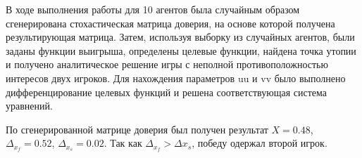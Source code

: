 \conclusion

В ходе выполнения работы для 10 агентов была случайным образом сгенерирована стохастическая матрица доверия,
на основе которой получена результирующая матрица. Затем, используя выборку из случайных агентов, были заданы
функции выигрыша, определены целевые функции, найдена точка утопии и получено аналитическое решение игры с неполной
противоположностью интересов двух игроков. Для нахождения параметров uu и vv было выполнено дифференцирование целевых
функций и решена соответствующая система уравнений.

По сгенерированной матрице доверия был получен результат $X = 0.48$, $\Delta_{x_f} = 0.52$, $\Delta_{x_s} = 0.02$.
Так как $\Delta_{x_f} > \Delta{x_s}$, победу одержал второй игрок.
